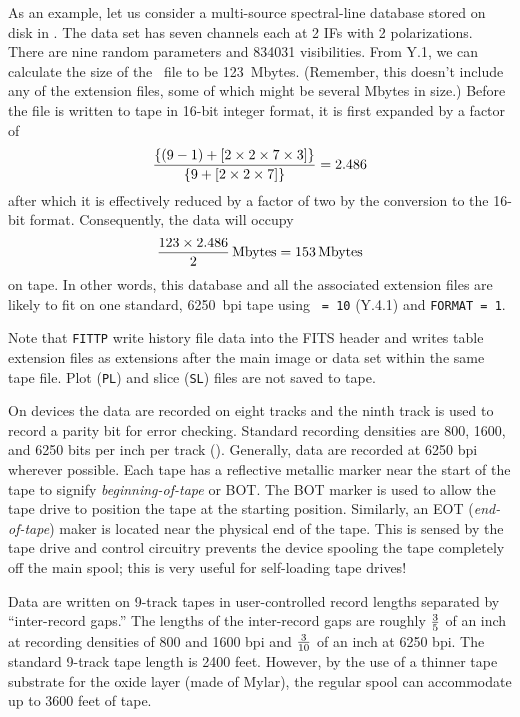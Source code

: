      As an example, let us consider a multi-source spectral-line
database stored on disk in .  The data set has
seven channels each at 2 IFs with 2 polarizations.  There are nine
random parameters and 834031 visibilities.  From \Sec Y.1, we can
calculate the size of the \uv\ file to be 123~Mbytes.  (Remember, this
doesn't include any  of the extension files, some of which might be
several Mbytes in size.)   Before the file is written to tape in
16-bit integer format, it is first expanded by a factor of
$$
 {\lbrace (9 - 1) + \lbrack 2 \times 2 \times
                                      7 \times 3 \rbrack \rbrace
\over
\lbrace 9 + \lbrack 2 \times 2 \times 7 \rbrack \rbrace}  = 2.486
$$
after which it is effectively reduced by a factor of two by the
conversion to the 16-bit format.  Consequently, the data will occupy
$$
   {{123 \times 2.486}  \over 2} \rm\, Mbytes
     = 153\rm\, Mbytes
$$
on tape.  In other words, this database and all the associated
extension files are likely to fit on one standard, 6250~bpi tape using
{\tt {} = 10} (\Sec Y.4.1) and {\tt FORMAT = 1}.

     Note that {\tt FITTP} write history file data into the FITS
header and writes table extension files as extensions after the main
image or data set within the same tape file.  Plot ({\tt PL}) and
slice ({\tt SL}) files are not saved to tape.


     On {\it {}} devices the data are recorded on
eight tracks and the ninth track is used to record a parity bit for
error checking.  Standard recording densities are 800, 1600, and 6250
bits per inch per track ({\it {}}).  Generally, data are
recorded at 6250 bpi wherever possible.  Each tape has a reflective
metallic marker near the start of the tape to signify {\it
beginning-of-tape} or \hbox{BOT}.  The BOT marker is used to allow the
tape drive to position the tape at the starting position. Similarly,
an EOT ({\it end-of-tape}) maker is located near the physical end of
the tape. This is sensed by the tape drive and control circuitry
prevents the device spooling the tape completely off the main spool;
this is very useful for self-loading tape drives!

     Data are written on 9-track tapes in user-controlled record
lengths separated by ``inter-record gaps.''  The lengths of the
inter-record gaps are roughly $3\over5$ of an inch at recording
densities of 800 and 1600 bpi and $3\over10$ of an inch at 6250 bpi.
The standard 9-track tape length is 2400 feet.  However, by the use of
a thinner tape substrate for the oxide layer (made of Mylar), the
regular spool can accommodate up to 3600 feet of tape.

